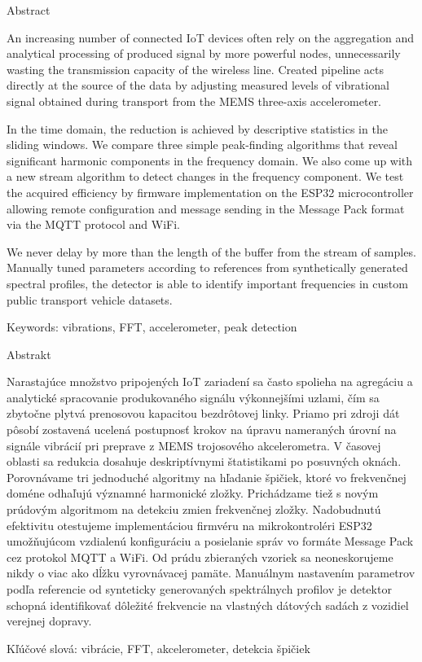 Abstract

An increasing number of connected IoT devices often rely on the aggregation and analytical processing of produced
signal by more powerful nodes, unnecessarily wasting the transmission capacity of the wireless line.
Created pipeline acts directly at the source of the data by adjusting measured levels of vibrational signal
obtained during transport from the MEMS three-axis accelerometer.

In the time domain, the reduction is achieved by descriptive statistics in the sliding windows. We compare three 
simple peak-finding algorithms that reveal significant harmonic components in the frequency domain. We also come up 
with a new stream algorithm to detect changes in the frequency component. We test the acquired efficiency by
firmware implementation on the ESP32 microcontroller allowing remote configuration and message sending in the Message Pack format 
via the MQTT protocol and WiFi. 

We  never delay by more than the length of the buffer from the stream of samples. Manually tuned
parameters according to references from synthetically generated spectral profiles, the detector is able to identify
important frequencies in custom public transport vehicle datasets.

Keywords: vibrations, FFT, accelerometer, peak detection


Abstrakt

Narastajúce množstvo pripojených IoT zariadení sa často spolieha na agregáciu a analytické spracovanie produkovaného
signálu výkonnejšími uzlami, čím sa zbytočne plytvá prenosovou kapacitou bezdrôtovej linky. Priamo pri zdroji dát pôsobí 
zostavená ucelená postupnosť krokov na úpravu nameraných úrovní na signále vibrácií pri preprave z MEMS trojosového akcelerometra.
V časovej oblasti sa redukcia dosahuje deskriptívnymi štatistikami po posuvných oknách. 
Porovnávame tri jednoduché algoritmy na hľadanie špičiek, ktoré vo frekvenčnej doméne odhaľujú významné harmonické zložky. 
Prichádzame tiež s novým prúdovým algoritmom na detekciu zmien frekvenčnej zložky. Nadobudnutú efektivitu otestujeme implementáciou 
firmvéru na mikrokontroléri ESP32 umožňujúcom vzdialenú konfiguráciu a posielanie správ vo formáte Message Pack cez protokol 
MQTT a WiFi. Od prúdu zbieraných vzoriek sa neoneskorujeme nikdy o viac ako dĺžku vyrovnávacej pamäte. Manuálnym nastavením 
parametrov podľa referencie od synteticky generovaných spektrálnych profilov je detektor schopná identifikovať dôležité 
frekvencie na vlastných dátových sadách z vozidiel verejnej dopravy.


Kľúčové slová: vibrácie, FFT, akcelerometer, detekcia špičiek